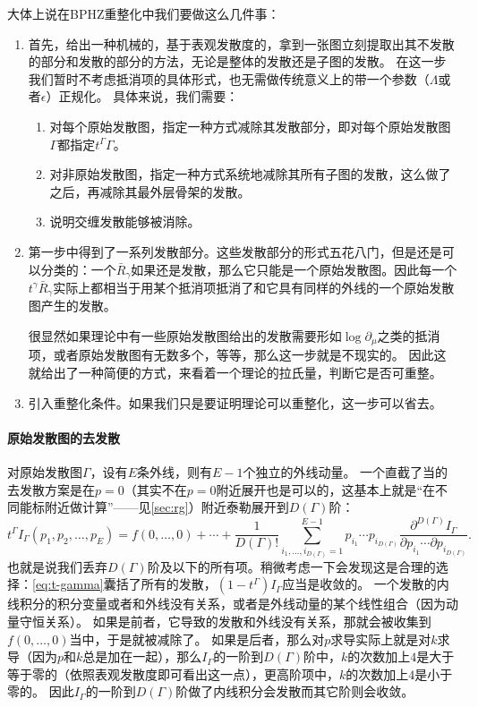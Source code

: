 大体上说在BPHZ重整化中我们要做这么几件事：
\begin{enumerate}
    \item 首先，给出一种机械的，基于表观发散度的，拿到一张图立刻提取出其不发散的部分和发散的部分的方法，无论是整体的发散还是子图的发散。
    在这一步我们暂时不考虑抵消项的具体形式，也无需做传统意义上的带一个参数（$\Lambda$或者$\epsilon$）正规化。
    具体来说，我们需要：
    \begin{enumerate}
        \item 对每个原始发散图，指定一种方式减除其发散部分，即对每个原始发散图$\Gamma$都指定$t^\Gamma \Gamma$。
        \item 对非原始发散图，指定一种方式系统地减除其所有子图的发散，这么做了之后，再减除其最外层骨架的发散。
        \item 说明交缠发散能够被消除。
    \end{enumerate}
    \item 第一步中得到了一系列发散部分。这些发散部分的形式五花八门，但是还是可以分类的：一个$\bar{R}_\gamma$如果还是发散，那么它只能是一个原始发散图。因此每一个$t^\gamma \bar{R}_\gamma$实际上都相当于用某个抵消项抵消了和它具有同样的外线的一个原始发散图产生的发散。
    
    很显然如果理论中有一些原始发散图给出的发散需要形如$\log \partial_\mu$之类的抵消项，或者原始发散图有无数多个，等等，那么这一步就是不现实的。
    因此这就给出了一种简便的方式，来看着一个理论的拉氏量，判断它是否可重整。
    \item 引入重整化条件。如果我们只是要证明理论可以重整化，这一步可以省去。
\end{enumerate}

\paragraph{原始发散图的去发散} 对原始发散图$\Gamma$，设有$E$条外线，则有$E-1$个独立的外线动量。
一个直截了当的去发散方案是在$p=0$（其实不在$p=0$附近展开也是可以的，这基本上就是“在不同能标附近做计算”——见\autoref{sec:rg}）附近泰勒展开到$D(\Gamma)$阶：
\begin{equation}
    t^\Gamma I_\Gamma(p_1, p_2, \ldots, p_E) = f(0, \ldots, 0) + \cdots + \frac{1}{D(\Gamma)!} \sum_{i_1, \ldots, i_{D(\Gamma)} = 1}^{E-1} p_{i_1} \cdots p_{i_{D(\Gamma)}} \frac{\partial^{D(\Gamma)} I_\Gamma}{\partial p_{i_1} \cdots \partial p_{i_{D(\Gamma)}}}.
    \label{eq:t-gamma}
\end{equation}
也就是说我们丢弃$D(\Gamma)$阶及以下的所有项。稍微考虑一下会发现这是合理的选择：\eqref{eq:t-gamma}囊括了所有的发散，$(1-t^\Gamma) I_\Gamma$应当是收敛的。
一个发散的内线积分的积分变量或者和外线没有关系，或者是外线动量的某个线性组合（因为动量守恒关系）。
如果是前者，它导致的发散和外线没有关系，那就会被收集到$f(0, \ldots, 0)$当中，于是就被减除了。
如果是后者，那么对$p$求导实际上就是对$k$求导（因为$p$和$k$总是加在一起），那么$I_\Gamma$的一阶到$D(\Gamma)$阶中，$k$的次数加上$4$是大于等于零的（依照表观发散度即可看出这一点），更高阶项中，$k$的次数加上$4$是小于零的。
因此$I_\Gamma$的一阶到$D(\Gamma)$阶做了内线积分会发散而其它阶则会收敛。

